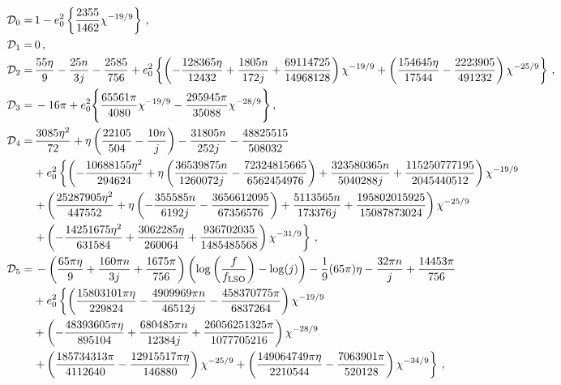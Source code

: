 \documentclass[aps,prd,twocolumn,superscriptaddress,groupedaddress,nofootinbib,showpacs,eqsecnum,useAms]{revtex4-2}
\begin{document}
\begin{widetext}
\begin{subequations}
\begin{align}
{\cal D}_0=& \, 1- e_0^2 \left\{ \frac{2355}{1462} \chi^{-19/9}\right\}\,, \\
{\cal D}_1=& \, 0\,, \\
{\cal D}_2=& \, \frac{55 \eta }{9}-\frac{25 n}{3 j}-\frac{2585}{756} + e_0^2 \left\{\left(-\frac{128365 \eta }{12432}+\frac{1805 n}{172 j}+\frac{69114725}{14968128}\right) \chi^{-19/9} + \left(\frac{154645 \eta }{17544}-\frac{2223905}{491232}\right) \chi^{-25/9} \right\}\,, \\ 
{\cal D}_3=& \, -16 \pi + e_0^2 \Bigg\{\frac{65561 \pi }{4080}\chi ^{-19/9}-\frac{295945 \pi }{35088}\chi ^{-28/9}\Bigg\}\,, \\
{\cal D}_4=& \, \frac{3085 \eta ^2}{72}+\eta  \left(\frac{22105}{504}-\frac{10 n}{j}\right)-\frac{31805 n}{252 j}-\frac{48825515}{508032} \notag \\
& +e_0^2 \left\{\left(-\frac{10688155 \eta ^2}{294624} + \eta  \left(\frac{36539875 n}{1260072 j}-\frac{72324815665}{6562454976}\right)+\frac{323580365 n}{5040288 j}+\frac{115250777195}{2045440512}\right)\chi ^{-19/9} \right. \notag \\
&\left. + \left(\frac{25287905 \eta ^2}{447552}+\eta  \left(-\frac{355585 n}{6192 j}-\frac{3656612095}{67356576}\right)+\frac{5113565 n}{173376 j}+\frac{195802015925}{15087873024}\right)\chi ^{-25/9} \right. \notag \\ 
&\left. + \left(-\frac{14251675 \eta ^2}{631584}+\frac{3062285 \eta }{260064}+\frac{936702035}{1485485568}\right)\chi ^{-31/9} \right\}\,, \\
 {\cal D}_5=& \, -\left(\frac{65 \pi \eta }{9}+\frac{160 \pi n}{3 j}+\frac{1675 \pi }{756}\right) \left(\log \left(\frac{f}{f_\text{LSO}}\right)-\log (j)\right)-\frac{1}{9} (65 \pi ) \eta -\frac{32 \pi n}{j}+\frac{14453 \pi }{756} \notag \\
 & + e_0^2 \left\{ \left(\frac{15803101 \pi \eta }{229824}-\frac{4909969 \pi n}{46512 j}-\frac{458370775 \pi }{6837264}\right) \chi^{-19/9} \right. \notag \\
 & + \left(-\frac{48393605 \pi \eta }{895104}+\frac{680485 \pi n}{12384 j}+\frac{26056251325 \pi }{1077705216}\right) \chi^{-28/9} \notag \\
 & \left. + \left(\frac{185734313 \pi }{4112640}-\frac{12915517 \pi \eta }{146880}\right) \chi^{-25/9} + \left(\frac{149064749 \pi \eta }{2210544}-\frac{7063901 \pi }{520128}\right) \chi^{-34/9} \right\}\,,  \\ 

\end{align}
\end{subequations}
\end{widetext}
\end{document}
